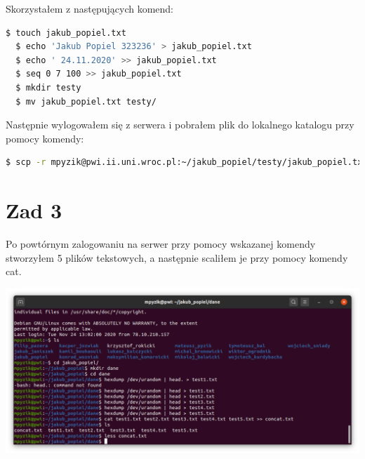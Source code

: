 \documentclass[a4paper]{article}
\begin{document}
Skorzystałem z następujących komend:
\begin{lstlisting}[language=bash]
  $ touch jakub_popiel.txt
  $ echo 'Jakub Popiel 323236' > jakub_popiel.txt
  $ echo ' 24.11.2020' >> jakub_popiel.txt
  $ seq 0 7 100 >> jakub_popiel.txt
  $ mkdir testy
  $ mv jakub_popiel.txt testy/
\end{lstlisting}

Następnie wylogowałem się z serwera i pobrałem plik do lokalnego katalogu przy pomocy komendy:

\begin{lstlisting}[language=bash] 
  $ scp -r mpyzik@pwi.ii.uni.wroc.pl:~/jakub_popiel/testy/jakub_popiel.txt .
\end{lstlisting}

\section{Zad 3}
Po powtórnym zalogowaniu na serwer przy pomocy wskazanej komendy stworzyłem 5 plików tekstowych, a następnie scaliłem je przy pomocy komendy cat.

\includegraphics[scale=0.5]{Screenshot from 2020-11-24 13-09-51.png} 
\end{document}
